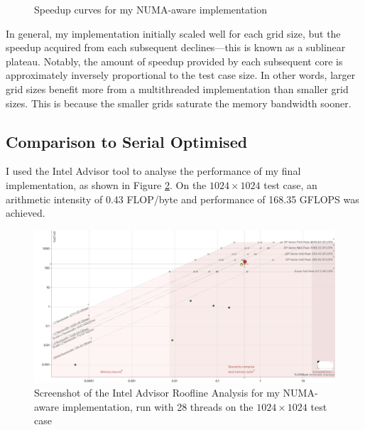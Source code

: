 \documentclass[twocolumn, a4paper]{article}
\begin{document}
\begin{figure}[htpb]
  \caption{Speedup curves for my NUMA-aware implementation}\label{fig:scaling}
\end{figure}

In general, my implementation initially scaled well for each grid size, but the speedup acquired from each subsequent declines---this is known as a sublinear plateau.
Notably, the amount of speedup provided by each subsequent core is approximately inversely proportional to the test case size.
In other words, larger grid sizes benefit more from a multithreaded implementation than smaller grid sizes.
This is because the smaller grids saturate the memory bandwidth sooner.

\subsection{Comparison to Serial Optimised}

I used the Intel Advisor tool to analyse the performance of my final implementation, as shown in Figure \ref{fig:roofline_numa}.
On the $1024\times1024$ test case, an arithmetic intensity of 0.43 FLOP/byte and performance of 168.35 GFLOPS was achieved.

\begin{figure}[htbp]
  \includegraphics[width=\linewidth]{roofline_numa.png}
  \caption{Screenshot of the Intel Advisor Roofline Analysis for my NUMA-aware implementation, run with 28 threads on the $1024\times1024$ test case}\label{fig:roofline_numa}
\end{figure}
\end{document}
